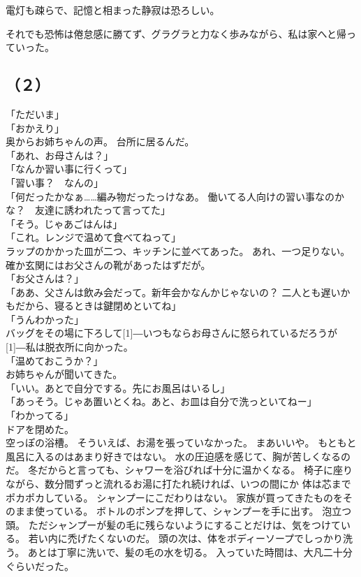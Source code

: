 \documentclass[../IHMain]{subfiles}
\begin{document}
電灯も疎らで、記憶と相まった静寂は恐ろしい。

それでも恐怖は倦怠感に勝てず、グラグラと力なく歩みながら、私は家へと帰っていった。

\subsection*{（２）}
「ただいま」\\
「おかえり」\\
奥からお姉ちゃんの声。
台所に居るんだ。\\
「あれ、お母さんは？」\\
「なんか習い事に行くって」\\
「習い事？　なんの」\\
「何だったかなぁ……編み物だったっけなあ。
働いてる人向けの習い事なのかな？　友達に誘われたって言ってた」\\
「そう。じゃあごはんは」\\
「これ。レンジで温めて食べてねって」\\
ラップのかかった皿が二つ、キッチンに並べてあった。
あれ、一つ足りない。
確か玄関にはお父さんの靴があったはずだが。\\
「お父さんは？」\\
「ああ、父さんは飲み会だって。新年会かなんかじゃないの？ 
二人とも遅いかもだから、寝るときは鍵閉めといてね」\\
「うんわかった」\\
バッグをその場に下ろして\scalebox{3}[1]{―}いつもならお母さんに怒られているだろうが
\scalebox{3}[1]{―}私は脱衣所に向かった。\\
「温めておこうか？」\\
お姉ちゃんが聞いてきた。\\
「いい。あとで自分でする。先にお風呂はいるし」\\
「あっそう。じゃあ置いとくね。あと、お皿は自分で洗っといてねー」\\
「わかってる」\\
ドアを閉めた。\\
空っぽの浴槽。
そういえば、お湯を張っていなかった。
まあいいや。
もともと風呂に入るのはあまり好きではない。
水の圧迫感を感じて、胸が苦しくなるのだ。
冬だからと言っても、シャワーを浴びれば十分に温かくなる。
椅子に座りながら、数分間ずっと流れるお湯に打たれ続ければ、いつの間にか
体は芯までポカポカしている。
シャンプーにこだわりはない。
家族が買ってきたものをそのまま使っている。
ボトルのポンプを押して、シャンプーを手に出す。
泡立つ頭。
ただシャンプーが髪の毛に残らないようにすることだけは、気をつけている。
若い内に禿げたくないのだ。
頭の次は、体をボディーソープでしっかり洗う。
あとは丁寧に洗いで、髪の毛の水を切る。
入っていた時間は、大凡二十分ぐらいだった。
\end{document}
